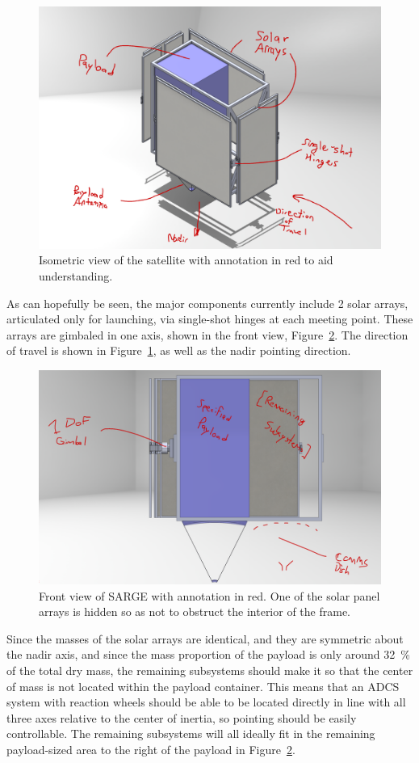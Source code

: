 \documentclass[9pt]{article}
\begin{document}
\begin{figure}[h]
  \centering
  \captionsetup{width=.75\linewidth,font=small,labelfont=bf}
  \includegraphics[width=.4\linewidth]{iso}
  \caption{Isometric view of the satellite with annotation in red to aid understanding.}
  \label{fig:iso}
\end{figure}

As can hopefully be seen, the major components currently include 2 solar arrays, articulated only for launching, via single-shot hinges at each meeting point.
These arrays are gimbaled in one axis, shown in the front view, Figure~\ref{fig:front}.
The direction of travel is shown in Figure~\ref{fig:iso}, as well as the nadir pointing direction.

\begin{figure}[h]
  \centering
  \captionsetup{width=.75\linewidth,font=small,labelfont=bf}
  \includegraphics[width=.4\linewidth]{front}
  \caption{Front view of SARGE with annotation in red. One of the solar panel arrays is hidden so as not to obstruct the interior of the frame.}
  \label{fig:front}
\end{figure}

Since the masses of the solar arrays are identical, and they are symmetric about the nadir axis, and since the mass proportion of the payload is only around \qty{32}{\percent} of the total dry mass, the remaining subsystems should make it so that the center of mass is not located within the payload container.
This means that an ADCS system with reaction wheels should be able to be located directly in line with all three axes relative to the center of inertia, so pointing should be easily controllable.
The remaining subsystems will all ideally fit in the remaining payload-sized area to the right of the payload in Figure~\ref{fig:front}.
\end{document}
